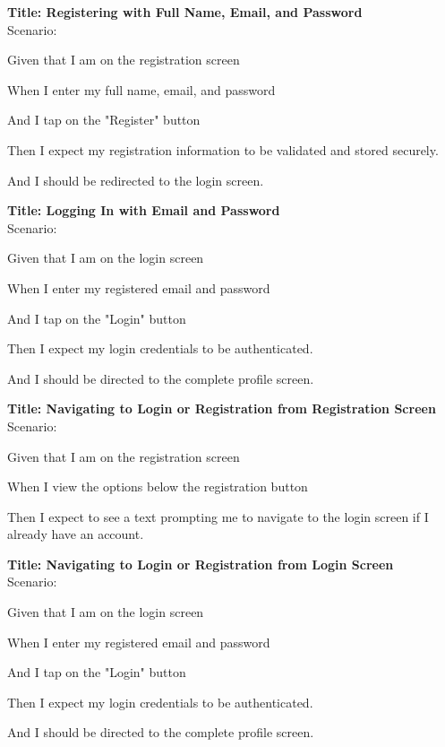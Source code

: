 \bigskip
\textbf{Title: Registering with Full Name, Email, and Password} \\
Scenario:
\begin{compactitem}
    \item Given that I am on the registration screen
    \item When I enter my full name, email, and password
    \item And I tap on the "Register" button
    \item Then I expect my registration information to be validated and stored securely.
    \item And I should be redirected to the login screen.
\end{compactitem}

\bigskip
\textbf{Title: Logging In with Email and Password} \\
Scenario:
\begin{compactitem}
    \item Given that I am on the login screen
    \item When I enter my registered email and password
    \item And I tap on the "Login" button
    \item Then I expect my login credentials to be authenticated.
    \item And I should be directed to the complete profile screen.
\end{compactitem}

\bigskip
\textbf{Title: Navigating to Login or Registration from Registration Screen} \\
Scenario:
\begin{compactitem}
    \item Given that I am on the registration screen
    \item When I view the options below the registration button
    \item Then I expect to see a text prompting me to navigate to the login screen if I already have an account.
\end{compactitem}

\bigskip
\textbf{Title: Navigating to Login or Registration from Login Screen} \\
Scenario:
\begin{compactitem}
    \item Given that I am on the login screen
    \item When I enter my registered email and password
    \item And I tap on the "Login" button
    \item Then I expect my login credentials to be authenticated.
    \item And I should be directed to the complete profile screen.
\end{compactitem}

